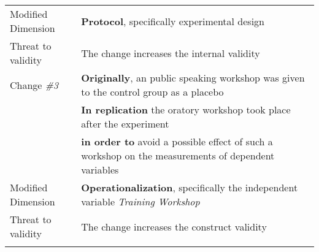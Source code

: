 \begin{table*}[h]
\begin{tabularx}{\textwidth}{
  >{\hsize=0.3\hsize}X
  >{\hsize=0.8\hsize}X}
Modified Dimension & \textbf{Protocol}, specifically experimental design \\  
Threat to validity  &  The change increases the internal validity    \\
\hline


 Change \textit{\#3}   &  \textbf{Originally}, an public speaking workshop was given to the control group as a placebo
   \\& \textbf{In replication} the oratory workshop took place after the experiment  \\&
    \textbf{in order to} avoid a possible effect of such a workshop on the measurements of dependent variables\\
  
Modified Dimension & \textbf{Operationalization}, specifically the independent variable  \textit {Training Workshop} \\   
    Threat to validity & The change increases the construct validity   \\
   
	\noalign{\smallskip\smallskip}\hline
	\end{tabularx}  
\end{table*}
